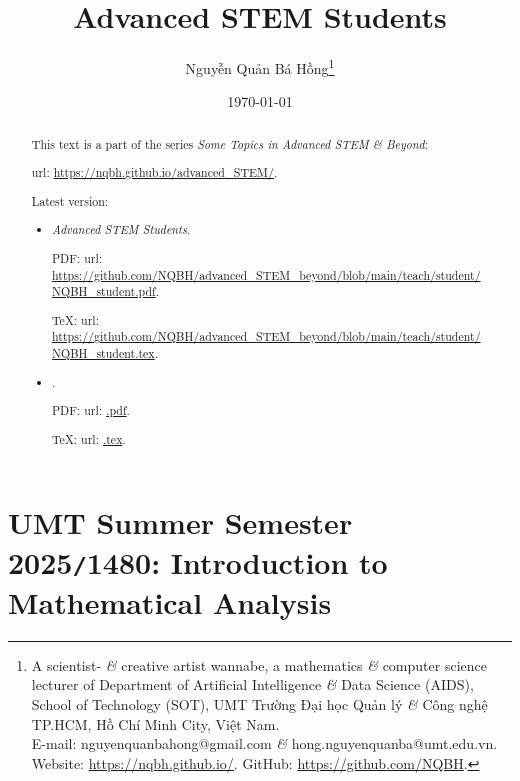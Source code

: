 \documentclass{article}
\title{Advanced STEM Students}
\author{Nguyễn Quản Bá Hồng\footnote{A scientist- {\it\&} creative artist wannabe, a mathematics {\it\&} computer science lecturer of Department of Artificial Intelligence {\it\&} Data Science (AIDS), School of Technology (SOT), UMT Trường Đại học Quản lý {\it\&} Công nghệ TP.HCM, Hồ Chí Minh City, Việt Nam.\\E-mail: {\sf nguyenquanbahong@gmail.com} {\it\&} {\sf hong.nguyenquanba@umt.edu.vn}. Website: \url{https://nqbh.github.io/}. GitHub: \url{https://github.com/NQBH}.}}
\date{\today}
\begin{document}
\maketitle
\begin{abstract}
	This text is a part of the series {\it Some Topics in Advanced STEM \& Beyond}:

	{\sc url}: \url{https://nqbh.github.io/advanced_STEM/}.

	Latest version:
	\begin{itemize}
		\item {\it Advanced STEM Students}.

		PDF: {\sc url}: \url{https://github.com/NQBH/advanced_STEM_beyond/blob/main/teach/student/NQBH_student.pdf}.

		\TeX: {\sc url}: \url{https://github.com/NQBH/advanced_STEM_beyond/blob/main/teach/student/NQBH_student.tex}.
		\item {\it }.

		PDF: {\sc url}: \url{.pdf}.

		\TeX: {\sc url}: \url{.tex}.
	\end{itemize}
\end{abstract}
\tableofcontents


\section{UMT Summer Semester 2025{\tt/}1480: Introduction to Mathematical Analysis}
\end{document}
